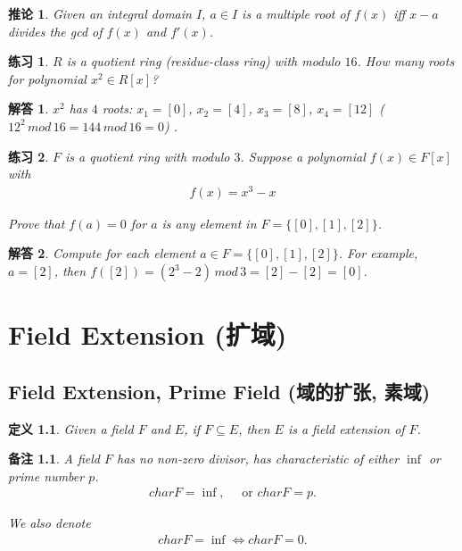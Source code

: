 \documentclass[utf8]{ctexbook}
\newtheorem{definition}{定义}[section]
\newtheorem{memo}{备注}[section]
\newtheorem{corollary}{推论}[section]
\newtheorem{exercise}{练习}[section]
\newtheorem*{soln}{解答}
\begin{document}
\begin{corollary}
Given an integral domain $I$, $a \in I$ is a multiple root of $f(x)$ iff $x-a$ divides the gcd of $f(x)$ and $f'(x)$.
\end{corollary}

\begin{exercise}
$R$ is a quotient ring (residue-class ring) with modulo $16$. How many roots for polynomial $x^2 \in R[x]$? 
\end{exercise}

\begin{soln}
$x^2$ has $4$ roots: $x_1 =[0]$, $x_2 = [4]$, $x_3 = [8]$, $x_4 = [12]$ ($12^2 \, mod \, 16 = 144  \, mod \, 16  = 0$) .
\end{soln}

\begin{exercise}
$F$ is a quotient ring with modulo $3$. Suppose a polynomial $f(x) \in F[x]$ with
\begin{align*}
f(x) = x^3 - x
\end{align*}

Prove that $f(a)=0$ for $a$ is any element in $F = \{ [0], [1], [2] \}$.

\end{exercise}

\begin{soln}
Compute for each element $a \in F = \{ [0], [1], [2] \}$. For example, $a = [2]$, then $f([2]) = (2^3 - 2)\, mod \, 3 = [2] - [2] = [0] $.
\end{soln}


\chapter{Field Extension (扩域)}

\section{Field Extension, Prime Field (域的扩张, 素域)}

\begin{definition}\label{def_field_extension}
Given a field $F$ and $E$, if $F \subseteq E$, then $E$ is a field extension of $F$.
\end{definition}

\begin{memo}
A field $F$ has no non-zero divisor, has characteristic of either $\inf$ or prime number $p$.
\begin{align*}
char F = \inf, \quad \mbox{ or } char F = p.
\end{align*}

We also denote
\begin{align*}
char F = \inf \iff char F = 0.
\end{align*}

\end{memo}
\end{document}
